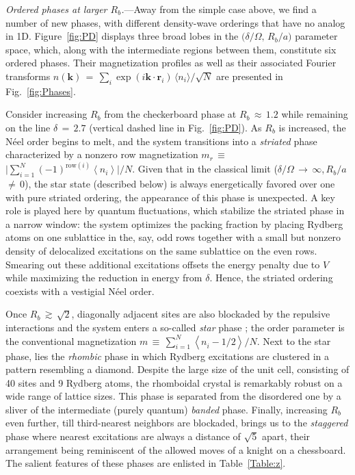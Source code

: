 \documentclass[prl,twocolumn,superscriptaddress,showpacs,amsmath,amstex,amssymb,citeautoscript]{revtex4-1}
\newcommand{\vect}[1]{\boldsymbol{#1}}
\begin{document}
 \emph{Ordered phases at larger $R_b$.}---Away from the simple case above, we find a number of new phases, with different density-wave orderings that have no analog in 1D. Figure~\ref{fig:PD} displays three broad lobes in the $(\delta/\Omega,$\,$R_b/a)$ parameter space, which, along with the intermediate regions between them, constitute six ordered phases. Their magnetization profiles as well as their associated Fourier transforms $n (\vect{k})$\,$=$\,$\sum_i \exp(i \vect{k}\cdot \vect{r}_i)$\,$\langle n_i\rangle /\sqrt{N}$ 
 are presented in Fig.~\ref{fig:Phases}. %



Consider increasing $R_b$ from the checkerboard phase at $R_b$\,$\approx$\,$1.2$ while remaining on the line $\delta$\,$=$\,$2.7$ (vertical dashed line in Fig.~\ref{fig:PD}).
As $R_b$ is increased, the N\'{e}el order begins to melt, 
and the system transitions into a \textit{striated} phase \cite{batrouni2000phase, chen2008supersolidity} characterized by a nonzero row magnetization
$
m^{}_r$\,$\equiv$\,$\big\lvert\sum_{i=1}^{N}(-1)^{\mathrm{row}(i)}\left\langle n_i\right\rangle\big\rvert/N.
$
Given that in the classical limit ($\delta/\Omega$\,$\rightarrow$\,$\infty$,\,$R_b/a$\,$\ne$\,$0$), 
the star state (described below) is always energetically favored over one with pure striated ordering, the appearance of this phase is unexpected. A key role is played here %
by quantum fluctuations, %
which stabilize the striated phase in a narrow window: the system optimizes the packing fraction by placing Rydberg atoms on one sublattice in the, say, odd rows together with a small but nonzero density of delocalized excitations on the same sublattice on the even rows. Smearing out these additional excitations offsets the energy penalty due to $V$ while maximizing the reduction in energy from $\delta$. Hence, the striated ordering coexists with a vestigial N\'{e}el order.

Once $R_b$\,$\gtrsim$\,$\sqrt{2}$, diagonally adjacent sites are also blockaded by the repulsive interactions and the system enters a so-called \textit{star} phase \cite{dang2008vacancy, dang2010phases};
the order parameter is the conventional magnetization $m$\,$\equiv$\,$\sum_{i=1}^{N}\left\langle n^{}_i -1/2\right\rangle /N$.
Next to the star phase, lies the \textit{rhombic} phase in which Rydberg excitations are clustered in a pattern resembling a diamond. 
Despite the large size of the 
unit cell, consisting of 40 sites and 9 Rydberg atoms, the rhomboidal crystal is remarkably robust on a wide range of lattice sizes. 
This phase is separated from the disordered one by a sliver of the intermediate (purely quantum) \textit{banded} phase. 
Finally, increasing $R_b$ even further, till third-nearest neighbors are blockaded, brings us to the \textit{staggered} phase where nearest excitations are always a distance of $\sqrt{5}$ apart, their arrangement being reminiscent of the allowed moves of a knight on a chessboard. 
The salient features of these phases are enlisted in Table~\ref{Table:z}.
\end{document}

